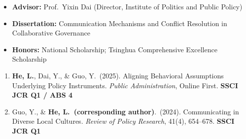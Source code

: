 \documentclass[10pt, a4paper]{altacv}
\begin{document}
\makecvheader



\begin{itemize}
  \item \textbf{Advisor:} Prof.\ Yixin Dai (Director, Institute of Politics and Public Policy)
  \item \textbf{Dissertation:} Communication Mechanisms and Conflict Resolution in Collaborative Governance
  \item \textbf{Honors:} National Scholarship; Tsinghua Comprehensive Excellence Scholarship
\end{itemize}

\divider





\begin{enumerate}
  \item \textbf{He, L.}, Dai, Y., \& Guo, Y.\ (2025).
    Aligning Behavioral Assumptions Underlying Policy Instruments.
    \textit{Public Administration}, Online First.
    \hfill {\color{soft}\textbf{SSCI JCR Q1 / ABS 4}}

  \item Guo, Y., \& \textbf{He, L.\ (corresponding author)}.\ (2024).
    Communicating in Diverse Local Cultures.
    \textit{Review of Policy Research}, 41(4), 654--678.
    \hfill {\color{soft}\textbf{SSCI JCR Q1}}
\end{enumerate}

\end{document}
